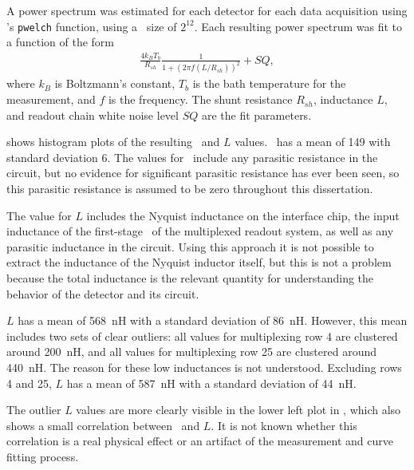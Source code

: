 A power spectrum was estimated for each detector for each data acquisition using \MATLAB's \texttt{pwelch} function, using a \FFT\ size of $2^{12}$.
Each resulting power spectrum was fit to a function of the form
\begin{eqnarray}\label{eqn:scnoise-fit}
	\frac{4 k_B T_b}{R_{sh}} \frac{1}{1 + (2 \pi f (L/R_{sh}))^2} + SQ,
\end{eqnarray}
where $k_B$ is Boltzmann's constant, $T_b$ is the bath temperature for the measurement, and $f$ is the frequency.
The shunt resistance $R_{sh}$, inductance $L$, and readout chain white noise level $SQ$ are the fit parameters.

 shows histogram plots of the resulting \Rsh\ and $L$ values.
\Rsh\ has a mean of \SI{149}{\uOhm} with standard deviation \SI{6}{\uOhm}.
The values for \Rsh\ include any parasitic resistance in the circuit, but no evidence for significant parasitic resistance has ever been seen, so this parasitic resistance is assumed to be zero throughout this dissertation.

The value for $L$ includes the Nyquist inductance on the interface chip, the input inductance of the first-stage \SQUID\ of the multiplexed readout system, as well as any parasitic inductance in the circuit.
Using this approach it is not possible to extract the inductance of the Nyquist inductor itself, but this is not a problem because the total inductance is the relevant  quantity for understanding the behavior of the detector and its circuit.

$L$ has a mean of 568~nH with a standard deviation of 86~nH.
However, this mean includes two sets of clear outliers: all values for multiplexing row 4 are clustered around 200~nH, and all values for multiplexing row 25 are clustered around 440~nH.
The reason for these low inductances is not understood.
Excluding rows 4 and 25,  $L$ has a mean of 587~nH with a standard deviation of 44~nH.

The outlier $L$ values are more clearly visible in the lower left plot in , which also shows a small correlation between \Rsh\ and $L$.
It is not known whether this correlation is a real physical effect or an artifact of the measurement and curve fitting process.


